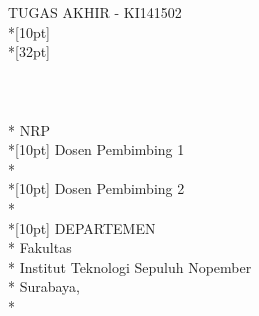 \newpage

	\sffamily
	\thispagestyle{empty}
	\color{white}
	{ \noindent TUGAS AKHIR - KI141502 }\\*[10pt] 
	{\large\textbf{\MakeUppercase{\judul}}} \\*[32pt]
	\\
	\\
	\\
	\MakeUppercase{\penulis} \\*
	NRP \nrp \\*[10pt]
	Dosen Pembimbing 1 \\*
	\pembimbingSatu \\*[10pt]
	Dosen Pembimbing 2 \\*
	\pembimbingDua \\*[10pt]
	DEPARTEMEN \MakeUppercase{\jurusan} \\*
	Fakultas \fakultas \\*
	Institut Teknologi Sepuluh Nopember \\*
	Surabaya, \tahun \\*
	\rmfamily
	\normalsize
	\restoregeometry
	\color{black}
	\cleardoublepage
	
